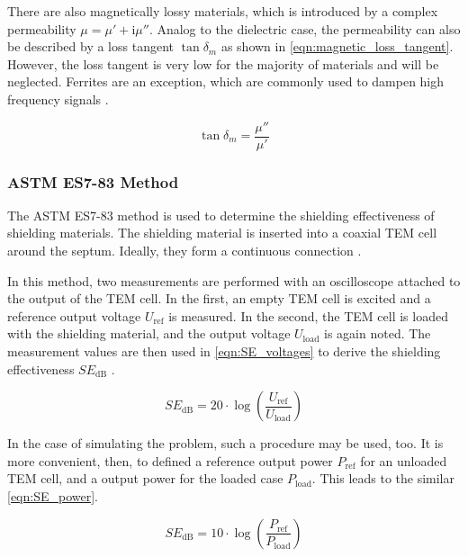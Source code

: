 There are also magnetically lossy materials, which is introduced by a complex permeability $\mu=\mu'+\mathrm{i}\mu''$. Analog to the dielectric case, the permeability can also be described by a loss tangent $\tan{\delta_m}$ as shown in \autoref{eqn:magnetic_loss_tangent}. However, the loss tangent is very low for the majority of materials and will be neglected. Ferrites are an exception, which are commonly used to dampen high frequency signals \cite{Balanis_2012}.

\begin{equation}
    \tan{\delta_m}=\frac{\mu''}{\mu'}
    \label{eqn:magnetic_loss_tangent}
\end{equation}



\subsubsection{ASTM ES7-83 Method}

The ASTM ES7-83 method is used to determine the shielding effectiveness of shielding materials. The shielding material is inserted into a coaxial TEM cell around the septum. Ideally, they form a continuous connection \cite{MORARI_BĂLAN_2015}. 

In this method, two measurements are performed with an oscilloscope attached to the output of the TEM cell. In the first, an empty TEM cell is excited and a reference output voltage $U_\mathrm{ref}$ is measured. In the second, the TEM cell is loaded with the shielding material, and the output voltage $U_\mathrm{load}$ is again noted. The measurement values are then used in \autoref{eqn:SE_voltages} to derive the shielding effectiveness $SE_\mathrm{dB}$ \cite{MORARI_BĂLAN_2015}.

\begin{equation}
    SE_\mathrm{dB}=20\cdot\log{\left(\frac{U_\mathrm{ref}}{U_\mathrm{load}}\right)}
    \label{eqn:SE_voltages}
\end{equation}

In the case of simulating the problem, such a procedure may be used, too. It is more convenient, then, to defined a reference output power $P_\mathrm{ref}$ for an unloaded TEM cell, and a output power for the loaded case $P_\mathrm{load}$. This leads to the similar \autoref{eqn:SE_power}.

\begin{equation}
    SE_\mathrm{dB}=10\cdot\log{\left( \frac{P_\mathrm{ref}}{P_\mathrm{load}} \right)}
    \label{eqn:SE_power}
\end{equation}

